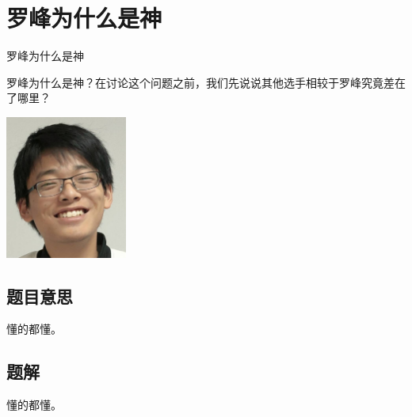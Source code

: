 \def\sectionName{罗峰为什么是神}
\section[\TOCName]{\sectionName}



\begin{frame}

\isBeamerMode\relax
    {\Huge \sectionName}\par
\fi




罗峰为什么是神？在讨论这个问题之前，我们先说说其他选手相较于罗峰究竟差在了哪里？

\begin{center}
\includegraphics[width=0.3\textwidth]{./pic/luofeng.jpg}
\end{center}

\end{frame}

\subsection{题目意思}
\begin{frame} %
懂的都懂。
\end{frame}



\subsection{题解}
\begin{frame}
懂的都懂。
\end{frame}


